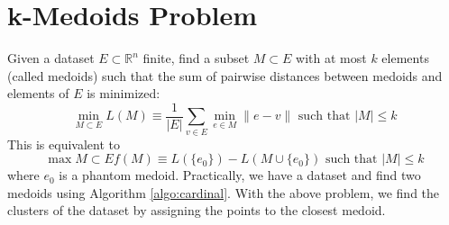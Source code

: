 \documentclass[12pt, openany]{report}
\newcommand{\R}{\mathbb{R}}
\theoremstyle{definition}
\begin{document}
\section{k-Medoids Problem}
Given a dataset $E\subset \R^n$ finite, find a subset $M\subset E$ with at most $k$ elements (called medoids) such that the sum of pairwise distances between medoids and elements of $E$ is minimized:
\begin{equation}
    \min_{M\subset E} L(M)\equiv \frac{1}{|E|}\sum_{v\in E} \min_{e\in M}\lVert e-v\rVert \text{    such that    } |M|\le k
\end{equation}
This is equivalent to 
\begin{equation}
    \max{M\subset E} f(M)\equiv L(\{e_0\})-L(M\cup \{e_0\})\text{    such that    } |M|\le k
\end{equation}
where $e_0$ is a phantom medoid. Practically, we have a dataset and find two medoids using Algorithm \ref{algo:cardinal}. With the above problem, we find the clusters of the dataset by assigning the points to the closest medoid. 
\end{document}
